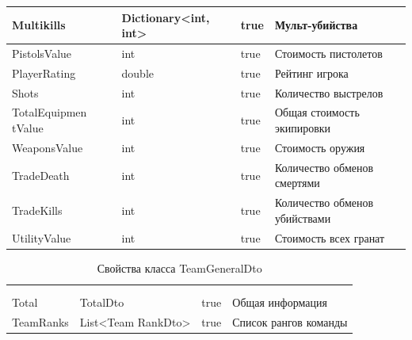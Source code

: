 \begin{xltabular}{\textwidth}{|X|X|X|X|}
	Multikills & Dictionary<int, int> & true & Мульт-убийства \\ \hline
	PistolsValue & int & true & Стоимость пистолетов \\ \hline
	PlayerRating & double & true & Рейтинг игрока \\ \hline
	Shots & int & true & Количество выстрелов \\ \hline
	TotalEquipmen
	tValue & int & true & Общая стоимость экипировки \\ \hline
	WeaponsValue & int & true & Стоимость оружия \\ \hline
	TradeDeath & int & true & Количество обменов смертями \\ \hline
	TradeKills & int & true & Количество обменов убийствами \\ \hline
	UtilityValue & int & true & Стоимость всех гранат \\ \hline
\end{xltabular}

\begin{xltabular}{\textwidth}{|X|X|c|X|}
	\caption{Свойства класса TeamGeneralDto}\label{table:TeamGeneralDto}\\ \hline
	 &  &  &  \\ \hline
	 &  &  &  \\ \hline
	\endfirsthead
	 \hline
	 &  &  &  \\ \hline
	\endhead
	Total & TotalDto & true & Общая информация \\ \hline
	TeamRanks & List<Team
	RankDto> & true & Список рангов команды \\ \hline
\end{xltabular}

